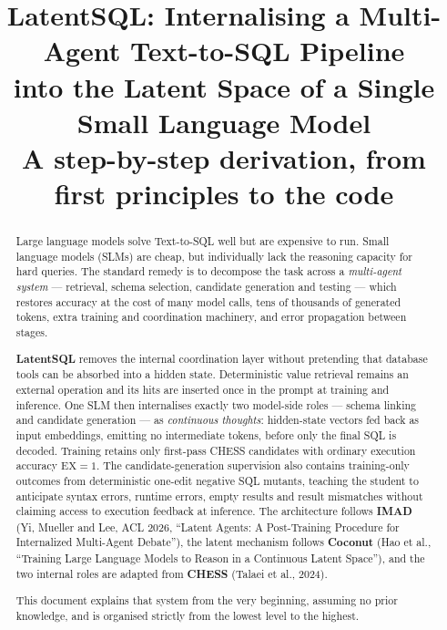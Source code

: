 \documentclass[11pt]{article}
\title{LatentSQL: Internalising a Multi-Agent Text-to-SQL Pipeline\\
into the Latent Space of a Single Small Language Model\\
\large A step-by-step derivation, from first principles to the code}
\author{}
\date{}
\theoremstyle{definition}
\begin{document}
\maketitle

\begin{abstract}
\noindent Large language models solve Text-to-SQL well but are expensive to run. Small language models (SLMs) are cheap, but individually lack the reasoning capacity for hard queries. The standard remedy is to decompose the task across a \emph{multi-agent system} --- retrieval, schema selection, candidate generation and testing --- which restores accuracy at the cost of many model calls, tens of thousands of generated tokens, extra training and coordination machinery, and error propagation between stages.

\textbf{LatentSQL} removes the internal coordination layer without pretending that database tools can be absorbed into a hidden state. Deterministic value retrieval remains an external operation and its hits are inserted once in the prompt at training and inference. One SLM then internalises exactly two model-side roles --- schema linking and candidate generation --- as \emph{continuous thoughts}: hidden-state vectors fed back as input embeddings, emitting no intermediate tokens, before only the final SQL is decoded. Training retains only first-pass CHESS candidates with ordinary execution accuracy $\mathrm{EX}=1$. The candidate-generation supervision also contains training-only outcomes from deterministic one-edit negative SQL mutants, teaching the student to anticipate syntax errors, runtime errors, empty results and result mismatches without claiming access to execution feedback at inference. The architecture follows \textbf{IMAD} (Yi, Mueller and Lee, ACL 2026, ``Latent Agents: A Post-Training Procedure for Internalized Multi-Agent Debate''), the latent mechanism follows \textbf{Coconut} (Hao et al., ``Training Large Language Models to Reason in a Continuous Latent Space''), and the two internal roles are adapted from \textbf{CHESS} (Talaei et al., 2024).

This document explains that system from the very beginning, assuming no prior knowledge, and is organised strictly from the lowest level to the highest.


\end{abstract}
\end{document}
